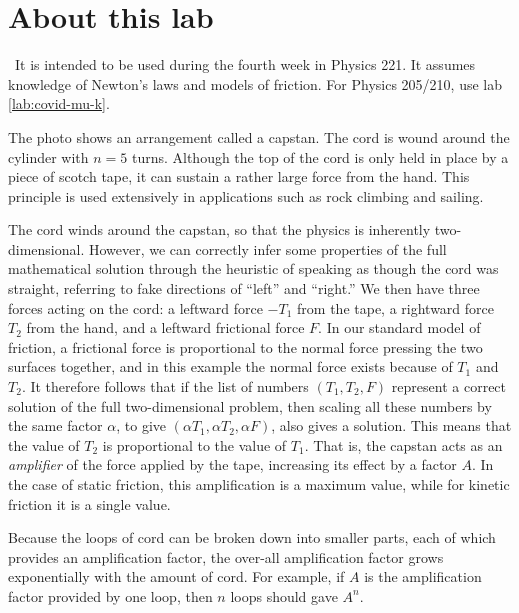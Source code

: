 \addtocounter{chapter}{-1}
\renewcommand\thechapter{c1.4b}
\label{lab:covid-capstan}

\section*{About this lab}

\covid\ 
It is intended to be used during the fourth week in Physics 221.
It assumes knowledge of Newton's laws and models of friction. For Physics
205/210, use lab \ref{lab:covid-mu-k}.

\introduction

The photo shows an arrangement called a capstan. The cord is wound around the cylinder
with $n=5$ turns. Although the top of the cord is only held in place by a piece of
scotch tape, it can sustain a rather large force from the hand. This principle
is used extensively in applications such as rock climbing and sailing.


The cord winds around the capstan, so that the physics is inherently two-dimensional.
However, we can correctly infer some properties of the full mathematical solution through
the heuristic of speaking as though the cord was straight, referring to fake
directions of ``left'' and ``right.'' We then have three forces acting on the cord:
a leftward force $-T_1$ from the tape, a rightward force $T_2$ from the hand, and
a leftward frictional force $F$. In our standard model of friction, a frictional force
is proportional to the normal force pressing the two surfaces together, and in this
example the normal force exists because of $T_1$ and $T_2$. It therefore follows that
if the list of numbers $(T_1,T_2,F)$ represent a correct solution of the full two-dimensional
problem, then scaling all these numbers by the same factor $\alpha$, to give
$(\alpha T_1,\alpha T_2,\alpha F)$, also gives a solution. This means that the value
of $T_2$ is proportional to the value of $T_1$. That is, the capstan acts as an \emph{amplifier}
of the force applied by the tape, increasing its effect by a factor $A$. In the case of static friction, this amplification is
a maximum value, while for kinetic friction it is a single value.

Because the loops of cord can be broken down into smaller parts, each of which
provides an amplification factor, the over-all amplification factor grows exponentially
with the amount of cord. For example, if $A$ is the amplification factor provided by
one loop, then $n$ loops should gave $A^n$.

